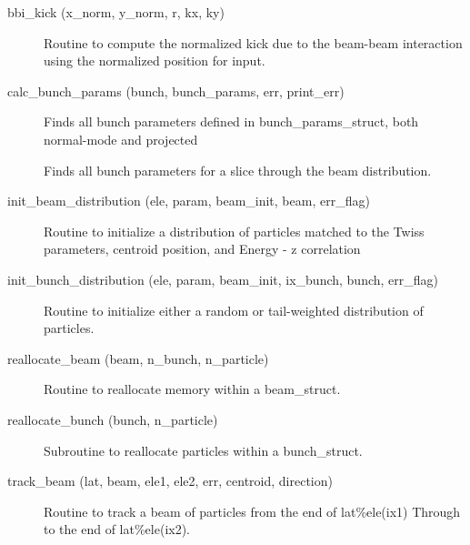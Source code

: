 \begin{description}

\label{r:bbi.kick}
\item[bbi_kick (x_norm, y_norm, r, kx, ky)] \Newline 
Routine to compute the normalized kick due to the beam-beam
interaction using the normalized position for input.

\label{r:calc.bunch.params}
\item[calc_bunch_params (bunch, bunch_params, err, print_err)] \Newline 
Finds all bunch parameters defined in bunch_params_struct, both normal-mode
and projected

\label{r:calc.bunch.params.slice}
\item[\protect\parbox{6in}{
    calc_bunch_params (bunch, bunch_params, plane, slice_center, \\
    \hspace*{1in} slice_spread, err, print_err) }] \Newline 
Finds all bunch parameters for a slice through the beam distribution.

\label{r:init.beam.distribution}
\item[init_beam_distribution (ele, param, beam_init, beam, err_flag)] \Newline 
Routine to initialize a distribution of particles matched to
the Twiss parameters, centroid position, and Energy - z correlation

\label{r:init.bunch.distribution}
\item[init_bunch_distribution (ele, param, beam_init, ix_bunch, bunch, err_flag)] \Newline 
Routine to initialize either a random or tail-weighted distribution of particles.  

\label{r:reallocate.beam}
\item[reallocate_beam (beam, n_bunch, n_particle)] \Newline 
Routine to reallocate memory within a beam_struct.

\label{r:reallocate.bunch}
\item[reallocate_bunch (bunch, n_particle)] \Newline 
Subroutine to reallocate particles within a bunch_struct.

\label{r:track.beam}
\item[track_beam (lat, beam, ele1, ele2, err, centroid, direction)] \Newline 
     Routine to track a beam of particles from the end of
     lat\%ele(ix1) Through to the end of lat\%ele(ix2).

\end{description}

